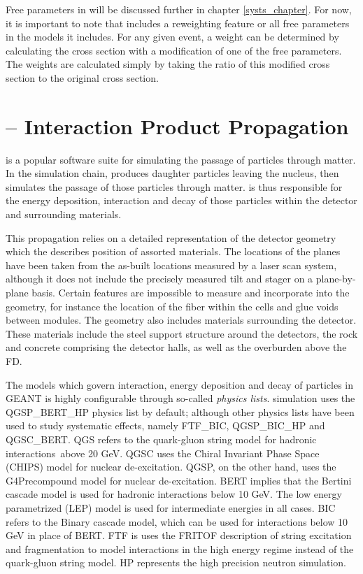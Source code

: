 Free parameters in \genie will be discussed further in chapter \ref{systs_chapter}.  For now, it is important to note that \genie includes a reweighting feature or all free parameters in the models it includes.  For any given event, a weight can be determined by calculating the cross section with a modification of one of the free parameters.  The weights are calculated simply by taking the ratio of this modified cross section to the original cross section.


\section{\geant -- Interaction Product Propagation}

\geant is a popular software suite for simulating the passage of particles through matter.  In the \nova simulation chain, \genie produces daughter particles leaving the nucleus, then \geant simulates the passage of those particles through matter.  \geant is thus responsible for the energy deposition, interaction and decay of those particles within the detector and surrounding materials.

This propagation relies on a detailed representation of the detector geometry which the describes position of assorted materials.  The locations of the planes have been taken from the as-built locations measured by a laser scan system, although it does not include the precisely measured tilt and stager on a plane-by-plane basis.  Certain features are impossible to measure and incorporate into the geometry, for instance the location of the fiber within the cells and glue voids between modules.  The geometry also includes materials surrounding the detector.  These materials include the steel support structure around the detectors, the rock and concrete comprising the detector halls, as well as the overburden above the FD.

The models which govern interaction, energy deposition and decay of particles in GEANT is highly configurable through so-called \textit{physics lists}.  \nova simulation uses the QGSP\_BERT\_HP physics list by default; although other physics lists have been used to study systematic effects, namely FTF\_BIC, QGSP\_BIC\_HP and QGSC\_BERT.  QGS refers to the quark-gluon string model for hadronic interactions above 20 GeV. \cite{kaidalov1982pomeron}  QGSC uses the Chiral Invariant Phase Space (CHIPS) model for nuclear de-excitation. \cite{kossov2002chiral}  QGSP, on the other hand, uses the G4Precompound model for nuclear de-excitation.  BERT implies that the Bertini cascade model is used for hadronic interactions below 10 GeV. \cite{bertini1971news,guthrie1968calculation}  The low energy parametrized (LEP) model is used for intermediate energies in all cases.  BIC refers to the Binary cascade model, which can be used for interactions below 10 GeV in place of BERT. \cite{folger2004binary}  FTF is uses the FRITOF description of string excitation and fragmentation to model interactions in the high energy regime instead of the quark-gluon string model. \cite{andersson1993fritiof}  HP represents the \geant high precision neutron simulation.

